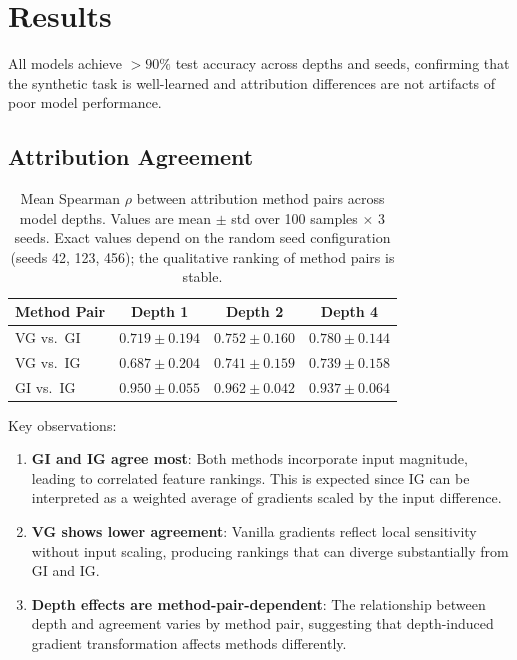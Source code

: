 \documentclass[11pt,a4paper]{article}
\begin{document}
\section{Results}

All models achieve $>90\%$ test accuracy across depths and seeds, confirming that the synthetic task is well-learned and attribution differences are not artifacts of poor model performance.

\subsection{Attribution Agreement}

\begin{table}[h]
\centering
\caption{Mean Spearman $\rho$ between attribution method pairs across model depths. Values are mean $\pm$ std over 100 samples $\times$ 3 seeds. Exact values depend on the random seed configuration (seeds 42, 123, 456); the qualitative ranking of method pairs is stable.}
\label{tab:agreement}
\begin{tabular}{lccc}
\toprule
\textbf{Method Pair} & \textbf{Depth 1} & \textbf{Depth 2} & \textbf{Depth 4} \\
\midrule
VG vs.\ GI & $0.719 \pm 0.194$ & $0.752 \pm 0.160$ & $0.780 \pm 0.144$ \\
VG vs.\ IG & $0.687 \pm 0.204$ & $0.741 \pm 0.159$ & $0.739 \pm 0.158$ \\
GI vs.\ IG & $0.950 \pm 0.055$ & $0.962 \pm 0.042$ & $0.937 \pm 0.064$ \\
\bottomrule
\end{tabular}
\end{table}

Key observations:
\begin{enumerate}
    \item \textbf{GI and IG agree most}: Both methods incorporate input magnitude, leading to correlated feature rankings. This is expected since IG can be interpreted as a weighted average of gradients scaled by the input difference.
    \item \textbf{VG shows lower agreement}: Vanilla gradients reflect local sensitivity without input scaling, producing rankings that can diverge substantially from GI and IG.
    \item \textbf{Depth effects are method-pair-dependent}: The relationship between depth and agreement varies by method pair, suggesting that depth-induced gradient transformation affects methods differently.
\end{enumerate}
\end{document}
